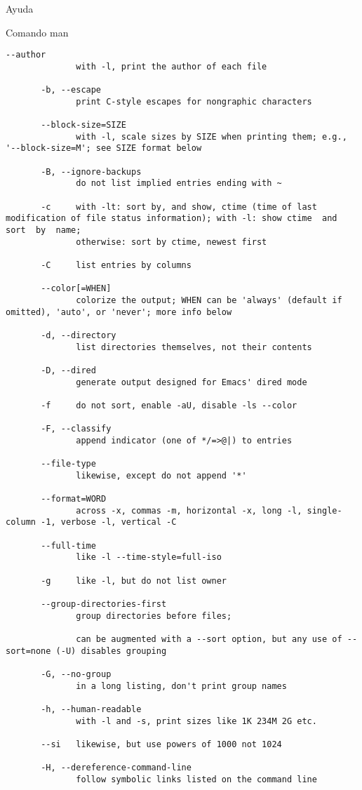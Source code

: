 \begin{section}{Ayuda}
\begin{subsection}{Comando man}
\begin{lstlisting}[style=Ubuntu]
       --author
              with -l, print the author of each file

       -b, --escape
              print C-style escapes for nongraphic characters

       --block-size=SIZE
              with -l, scale sizes by SIZE when printing them; e.g., '--block-size=M'; see SIZE format below

       -B, --ignore-backups
              do not list implied entries ending with ~

       -c     with -lt: sort by, and show, ctime (time of last modification of file status information); with -l: show ctime  and  sort  by  name;
              otherwise: sort by ctime, newest first

       -C     list entries by columns

       --color[=WHEN]
              colorize the output; WHEN can be 'always' (default if omitted), 'auto', or 'never'; more info below

       -d, --directory
              list directories themselves, not their contents

       -D, --dired
              generate output designed for Emacs' dired mode

       -f     do not sort, enable -aU, disable -ls --color

       -F, --classify
              append indicator (one of */=>@|) to entries

       --file-type
              likewise, except do not append '*'

       --format=WORD
              across -x, commas -m, horizontal -x, long -l, single-column -1, verbose -l, vertical -C

       --full-time
              like -l --time-style=full-iso

       -g     like -l, but do not list owner

       --group-directories-first
              group directories before files;

              can be augmented with a --sort option, but any use of --sort=none (-U) disables grouping

       -G, --no-group
              in a long listing, don't print group names

       -h, --human-readable
              with -l and -s, print sizes like 1K 234M 2G etc.

       --si   likewise, but use powers of 1000 not 1024

       -H, --dereference-command-line
              follow symbolic links listed on the command line


\end{lstlisting}
\end{subsection}
\end{section}
